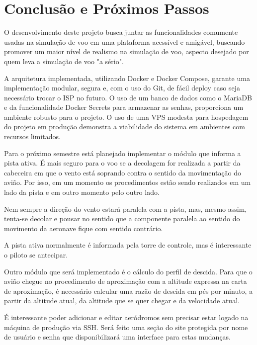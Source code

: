 \chapter{Conclusão e Próximos Passos}

O desenvolvimento deste projeto busca juntar as funcionalidades comumente usadas na 
simulação de voo em uma plataforma acessível e amigável, buscando promover um 
maior nível de realismo na simulação de voo, aspecto desejado por quem leva
a simulação de voo "a sério".

A arquitetura implementada, utilizando Docker e Docker Compose, garante uma 
implementação modular, segura e, com o uso do Git, de fácil deploy caso seja 
necessário trocar o ISP no futuro. O uso de um banco de dados como
o MariaDB e da funcionalidade Docker Secrets para armazenar as senhas, proporciona um 
ambiente robusto para o projeto.
O uso de uma VPS modesta para hospedagem do projeto em produção demonstra a 
viabilidade do sistema em ambientes com recursos limitados.

Para o próximo semestre está planejado implementar o 
módulo que informa a pista ativa. É mais seguro para o voo se a decolagem for 
realizada a partir da cabeceira em que o vento está soprando contra o sentido 
da movimentação do avião. Por isso, em um momento os procedimentos estão sendo 
realizados em um lado da pista e em outro momento pelo outro lado.

Nem sempre a direção do vento estará paralela com a pista, mas, mesmo assim, 
tenta-se decolar e pousar no sentido que a componente paralela ao sentido do 
movimento da aeronave fique com sentido contrário.

A pista ativa normalmente é informada pela torre de controle, mas é 
interessante o piloto se antecipar.

Outro módulo que será implementado é o cálculo do perfil de descida. Para que 
o avião chegue no procedimento de aproximação com a altitude expressa na 
carta de aproximação, é necessário calcular uma razão de descida em pés por 
minuto, a partir da altitude atual, da altitude que se quer chegar e da 
velocidade atual.

É interessante poder adicionar e editar aeródromos sem precisar estar logado
na máquina de produção via SSH. Será feito uma seção do site protegida por
nome de usuário e senha que disponibilizará uma interface para estas mudanças.